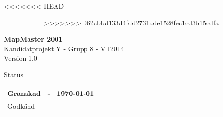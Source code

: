 ﻿\documentclass[a4paper,12pt,fleqn]{article}
\begin{document}
<<<<<<< HEAD
	
=======
>>>>>>> 062cbbd133d4fdd2731ade1528fec1cd3b15cdfa
	\pagestyle{fancy}
	\vspace*{\fill}
		\begingroup
			\begin{center}
				\huge{\textbf{MapMaster 2001}}
				\\
				\vspace{5pt}
				\normalsize
				Kandidatprojekt Y - Grupp 8 - VT2014
				\\
				Version 1.0
				\end{center}
		\endgroup
	\vspace*{\fill}
	
	\begin{center} %
		Status
		\\
		\vspace{3pt} %
	    \begin{tabular}{| p{3cm} | p{3cm} | p{3cm} |} %
	    \hline %
	    Granskad & - & \today \\ \hline %
		Godkänd & - & - \\ \hline %

	    \end{tabular}
	\end{center}
	\vspace{2cm}
	\newpage
	
\end{document}
